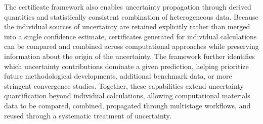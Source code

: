 \documentclass[twocolumn,superscriptaddress,amsmath,amssymb,longbibliography]{revtex4-2}
\newcommand{\conv}{\mathrm{conv}}
\newcommand{\meth}{\mathrm{method}}
\begin{document}
The certificate framework also enables uncertainty propagation through derived quantities and statistically consistent combination of heterogeneous data. Because the individual sources of uncertainty are retained explicitly rather than merged into a single confidence estimate, certificates generated for individual calculations can be compared and combined across computational approaches while preserving information about the origin of the uncertainty. The framework further identifies which uncertainty contributions dominate a given prediction, helping prioritize future methodological developments, additional benchmark data, or more stringent convergence studies. Together, these capabilities extend uncertainty quantification beyond individual calculations, allowing computational materials data to be compared, combined, propagated through multistage workflows, and reused through a systematic treatment of uncertainty.
\end{document}
